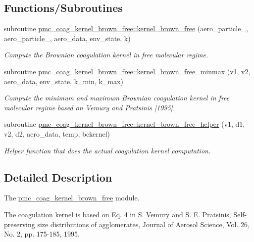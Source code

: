 \subsection*{Functions/\+Subroutines}
\begin{DoxyCompactItemize}
\item 
subroutine \mbox{\hyperlink{namespacepmc__coag__kernel__brown__free_acb35db238e663c0e830a6ce3effc98b6}{pmc\+\_\+coag\+\_\+kernel\+\_\+brown\+\_\+free\+::kernel\+\_\+brown\+\_\+free}} (aero\+\_\+particle\+\_, aero\+\_\+particle\+\_, aero\+\_\+data, env\+\_\+state, k)
\begin{DoxyCompactList}\small\item\em Compute the Brownian coagulation kernel in free molecular regime. \end{DoxyCompactList}\item 
subroutine \mbox{\hyperlink{namespacepmc__coag__kernel__brown__free_adb621b747cf27e71d37df880e3c82226}{pmc\+\_\+coag\+\_\+kernel\+\_\+brown\+\_\+free\+::kernel\+\_\+brown\+\_\+free\+\_\+minmax}} (v1, v2, aero\+\_\+data, env\+\_\+state, k\+\_\+min, k\+\_\+max)
\begin{DoxyCompactList}\small\item\em Compute the minimum and maximum Brownian coagulation kernel in free molecular regime based on Vemury and Pratsinis \mbox{[}1995\mbox{]}. \end{DoxyCompactList}\item 
subroutine \mbox{\hyperlink{namespacepmc__coag__kernel__brown__free_a3d26570456a6893dfc9661559d887375}{pmc\+\_\+coag\+\_\+kernel\+\_\+brown\+\_\+free\+::kernel\+\_\+brown\+\_\+free\+\_\+helper}} (v1, d1, v2, d2, aero\+\_\+data, temp, bckernel)
\begin{DoxyCompactList}\small\item\em Helper function that does the actual coagulation kernel computation. \end{DoxyCompactList}\end{DoxyCompactItemize}


\subsection{Detailed Description}
The \mbox{\hyperlink{namespacepmc__coag__kernel__brown__free}{pmc\+\_\+coag\+\_\+kernel\+\_\+brown\+\_\+free}} module. 

The coagulation kernel is based on Eq. 4 in S. Vemury and S. E. Pratsinis, Self-\/preserving size distributions of agglomerates, Journal of Aerosol Science, Vol. 26, No. 2, pp. 175-\/185, 1995. 